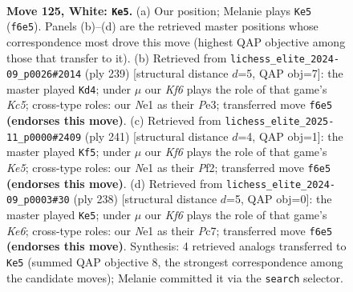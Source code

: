 \documentclass[11pt]{article}
\begin{document}
\clearpage

\begin{figure}[p]\centering
\begin{subfigure}{0.46\textwidth}\centering
\resizebox{\linewidth}{!}{%
\newchessgame
\chessboard[
  setfen={8/R7/2k2K2/8/6P1/8/8/1r2N3 w - - 33 125},
  showmover=false,
  pgfstyle=straightmove, color=movearrow, markmove={f6-e5}
]}
\caption{}
\end{subfigure}\hfill
\begin{subfigure}{0.46\textwidth}\centering
\resizebox{\linewidth}{!}{%
\newchessgame
\chessboard[
  setfen={8/8/4R3/8/2k5/4p3/1r6/5K2 b - - 49 120},
  showmover=false,
  pgfstyle=straightmove, color=movearrow, markmove={c4-d4}
]}
\caption{}
\end{subfigure}
\\[4pt]
\begin{subfigure}{0.46\textwidth}\centering
\resizebox{\linewidth}{!}{%
\newchessgame
\chessboard[
  setfen={8/8/6r1/8/R3k3/7K/5p2/8 b - - 11 121},
  showmover=false,
  pgfstyle=straightmove, color=movearrow, markmove={e4-f5}
]}
\caption{}
\end{subfigure}\hfill
\begin{subfigure}{0.46\textwidth}\centering
\resizebox{\linewidth}{!}{%
\newchessgame
\chessboard[
  setfen={k7/2P5/4K2r/8/1R6/8/8/8 w - - 49 120},
  showmover=false,
  pgfstyle=straightmove, color=movearrow, markmove={e6-e5}
]}
\caption{}
\end{subfigure}
\caption{\textbf{Move 125, White: \texttt{Ke5}.} (a) Our position; Melanie plays \texttt{Ke5} (\texttt{f6e5}). Panels (b)--(d) are the retrieved master positions whose correspondence most drove this move (highest QAP objective among those that transfer to it). (b) Retrieved from \texttt{lichess\_elite\_2024-09\_p0026\#2014} (ply 239) [structural distance $d$=5, QAP obj=7]: the master played \texttt{Kd4}; under $\mu$ our \emph{Kf6} plays the role of that game's \emph{Kc5}; cross-type roles: our \emph{N}e1 as their \emph{P}e3; transferred move \texttt{f6e5} \textbf{(endorses this move)}. (c) Retrieved from \texttt{lichess\_elite\_2025-11\_p0000\#2409} (ply 241) [structural distance $d$=4, QAP obj=1]: the master played \texttt{Kf5}; under $\mu$ our \emph{Kf6} plays the role of that game's \emph{Ke5}; cross-type roles: our \emph{N}e1 as their \emph{P}f2; transferred move \texttt{f6e5} \textbf{(endorses this move)}. (d) Retrieved from \texttt{lichess\_elite\_2024-09\_p0003\#30} (ply 238) [structural distance $d$=5, QAP obj=0]: the master played \texttt{Ke5}; under $\mu$ our \emph{Kf6} plays the role of that game's \emph{Ke6}; cross-type roles: our \emph{N}e1 as their \emph{P}c7; transferred move \texttt{f6e5} \textbf{(endorses this move)}. Synthesis: 4 retrieved analogs transferred to \texttt{Ke5} (summed QAP objective 8, the strongest correspondence among the candidate moves); Melanie committed it via the \texttt{search} selector.}
\label{fig:thought-m248}
\end{figure}
\end{document}
